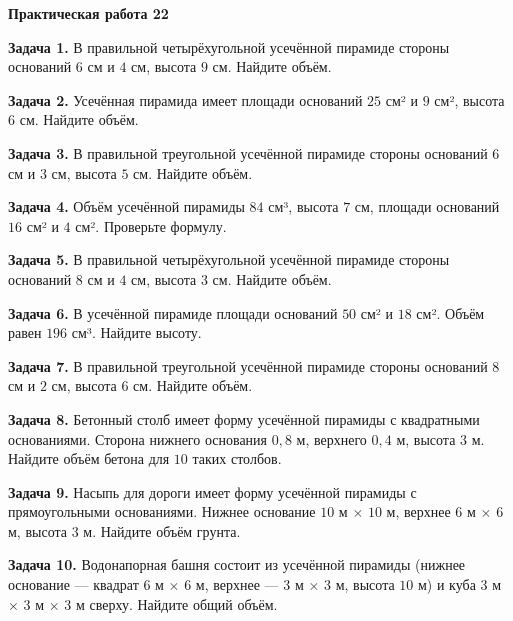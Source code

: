 \documentclass{umk-matematika}
\begin{document}
\begin{center}
{\Large\bfseries Практическая работа 22}
\end{center}
\vspace{0.5cm}

\textbf{Задача 1.} В правильной четырёхугольной усечённой пирамиде стороны оснований $6$ см и $4$ см, высота $9$ см. Найдите объём.\par\vspace{10pt}
\textbf{Задача 2.} Усечённая пирамида имеет площади оснований $25$ см² и $9$ см², высота $6$ см. Найдите объём.\par\vspace{10pt}
\textbf{Задача 3.} В правильной треугольной усечённой пирамиде стороны оснований $6$ см и $3$ см, высота $5$ см. Найдите объём.\par\vspace{10pt}
\textbf{Задача 4.} Объём усечённой пирамиды $84$ см³, высота $7$ см, площади оснований $16$ см² и $4$ см². Проверьте формулу.\par\vspace{10pt}
\textbf{Задача 5.} В правильной четырёхугольной усечённой пирамиде стороны оснований $8$ см и $4$ см, высота $3$ см. Найдите объём.\par\vspace{10pt}
\textbf{Задача 6.} В усечённой пирамиде площади оснований $50$ см² и $18$ см². Объём равен $196$ см³. Найдите высоту.\par\vspace{10pt}
\textbf{Задача 7.} В правильной треугольной усечённой пирамиде стороны оснований $8$ см и $2$ см, высота $6$ см. Найдите объём.\par\vspace{10pt}
\textbf{Задача 8.} Бетонный столб имеет форму усечённой пирамиды с квадратными основаниями. Сторона нижнего основания $0{,}8$ м, верхнего $0{,}4$ м, высота $3$ м. Найдите объём бетона для $10$ таких столбов.\par\vspace{10pt}
\textbf{Задача 9.} Насыпь для дороги имеет форму усечённой пирамиды с прямоугольными основаниями. Нижнее основание $10$ м $\times$ $10$ м, верхнее $6$ м $\times$ $6$ м, высота $3$ м. Найдите объём грунта.\par\vspace{10pt}
\textbf{Задача 10.} Водонапорная башня состоит из усечённой пирамиды (нижнее основание — квадрат $6$ м $\times$ $6$ м, верхнее — $3$ м $\times$ $3$ м, высота $10$ м) и куба $3$ м $\times$ $3$ м $\times$ $3$ м сверху. Найдите общий объём.\par\vspace{10pt}
\newpage
\end{document}
